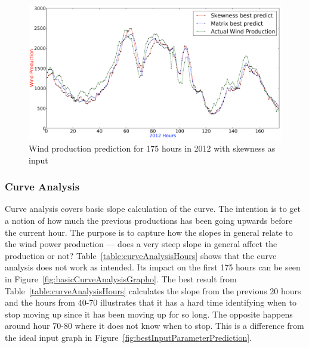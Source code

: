\begin{figure}[h!]
\centering
\includegraphics[width=0.99\linewidth]{billeder/bestSkewnessGraph.png}
\caption{Wind production prediction for 175 hours in 2012 with skewness as input}
\label{fig:bestSkewnessGraph}
\end{figure}    

\subsubsection{Curve Analysis}
Curve analysis covers basic slope calculation of the curve. The intention is to get a notion of how much the previous productions has been going upwards before the current hour. The purpose is to capture how the slopes in general relate to the wind power production --- does a very steep slope in general affect the production or not? Table~\ref{table:curveAnalysisHours} shows that the curve analysis does not work as intended. Its impact on the first 175 hours can be seen in Figure~\ref{fig:basicCurveAnalysisGrapho}. The best result from Table~\ref{table:curveAnalysisHours} calculates the slope from the previous 20 hours and the hours from 40-70 illustrates that it has a hard time identifying when to stop moving up since it has been moving up for so long. The opposite happens around hour 70-80 where it does not know when to stop. This is a difference from the ideal input graph in Figure~\ref{fig:bestInputParameterPrediction}.

